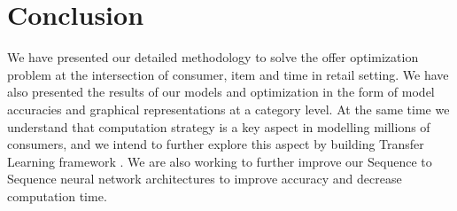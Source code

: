 \section{Conclusion}
\label{sec:conclusion}
We have presented our detailed methodology to solve the offer optimization problem at the intersection 
of consumer, item and time in retail setting. We have also presented the results of our models 
and optimization in the form of model accuracies and graphical representations at a category level.
At the same time we understand that computation strategy is a key aspect in modelling
millions of consumers, and we intend to further explore this aspect by building 
Transfer Learning framework \cite{yosinski2014transferable}. We are also working to 
further improve our Sequence to Sequence neural network architectures to improve accuracy
and decrease computation time.